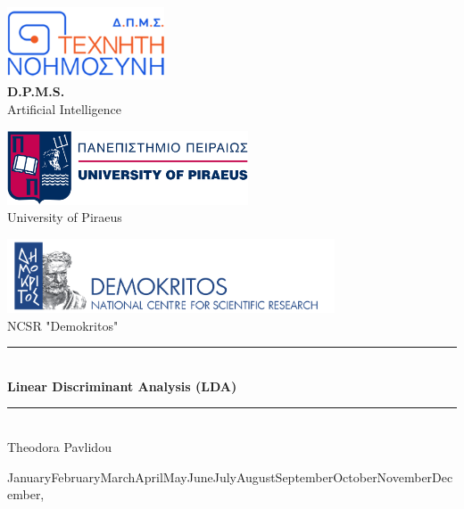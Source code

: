 \documentclass[12pt,a4paper]{article}
\newcommand{\HRule}{\rule{\linewidth}{0.5mm}}
\begin{document}
\begin{titlepage}
\centering

\includegraphics[width=0.35\textwidth]{images/program_logo.png}\\[1cm]
{\Large \textbf{D.P.M.S.}\\[0.2cm] Artificial Intelligence}\\[2cm]

\begin{minipage}{0.45\textwidth}
    \centering
    \includegraphics[height=2.2cm]{images/unipi_logo.png}\\[0.3cm]
    {\small University of Piraeus}
\end{minipage}
\hfill
\begin{minipage}{0.45\textwidth}
    \centering
    \includegraphics[height=2.2cm]{images/demokritos_logo.png}\\[0.3cm]
    {\small NCSR "Demokritos"}
\end{minipage}

\vspace{2.5cm}

\HRule \\[0.6cm]
{\huge \bfseries Linear Discriminant Analysis (LDA)}\\[0.3cm]
\HRule \\[2.5cm]

{\LARGE Theodora Pavlidou}\\[1cm]

\vfill

{\Large
\ifcase\month\or January\or February\or March\or April\or May\or June\or July\or August\or September\or October\or November\or December\fi, \number\year}

\end{titlepage}
\end{document}
